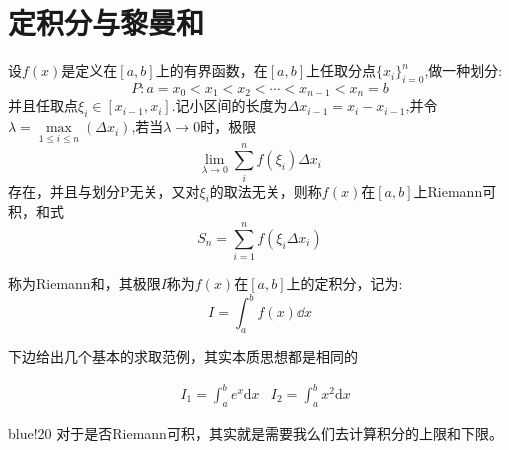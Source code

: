 \section{定积分与黎曼和}
\begin{definition}
    设$f(x)$是定义在$[a,b]$上的有界函数，在$[a, b]$上任取分点$\{x_i\}^n_{i=0}$,做一种划分:
    \[
        P:a=x_0<x_1<x_2<\cdots<x_{n-1}<x_n=b
    \]
    并且任取点$\xi_i\in[x_{i-1},x_i]$.记小区间的长度为$\Delta x_{i-1}=x_i-x_{i-1}$,并令$\lambda=\max\limits_{1\le i\le n}(\Delta x_i)$,若当$\lambda\to 0$时，极限
    \begin{equation}
        \lim\limits_{\lambda\to 0}{\sum_{i}^{n}{f(\xi_i)\Delta x_i}}\nonumber
    \end{equation}
    存在，并且与划分P无关，又对$\xi_i$的取法无关，则称$f(x)$在$[a, b]$上Riemann可积，和式
    \begin{equation}
        S_n= \sum_{i=1}^{n}{f(\xi_i\Delta x_i)}\nonumber
    \end{equation}

    称为Riemann和，其极限$I$称为$f(x)$在$[a, b]$上的定积分，记为:
    \begin{equation}
    I=\int_{a}^{b}{f(x) \dd x}\nonumber
    \end{equation}
\end{definition}
下边给出几个基本的求取范例，其实本质思想都是相同的\\
\vspace*{3pt}


\begin{framed}
    \begin{align*}
        & I_1=\int_{a}^{b}{e^x \mathrm{d}x}
        & \displaystyle I_2= \int_{a}^{b}{x^2 \mathrm{d}x}
    \end{align*}
\end{framed}

\begin{formal}{blue!20}
    对于是否Riemann可积，其实就是需要我么们去计算积分的上限和下限。
\end{formal}

